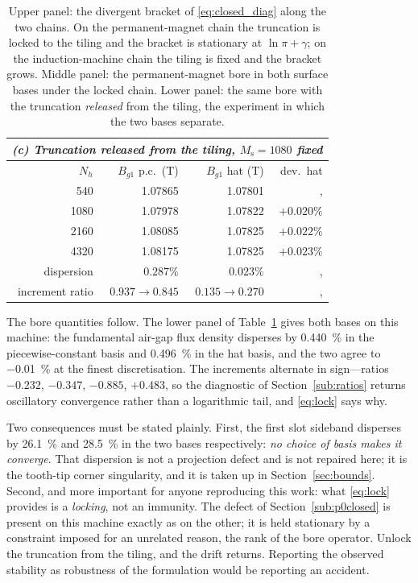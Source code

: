 \documentclass[10pt,a4paper,twocolumn]{article}
\theoremstyle{plain}
\theoremstyle{remark}
\begin{document}
\begin{table}[!ht]
\begin{threeparttable}
\vspace{3mm}

\begin{tabular}{rrrr}
\multicolumn{4}{l}{\emph{(c) Truncation released from the tiling,
$M_{\mathrm{s}}=\num{1080}$ fixed}}\\
\toprule
$N_h$ & $B_{g1}$ p.c.\ (\si{\tesla}) & $B_{g1}$ hat (\si{\tesla}) & dev.\ hat\\
\midrule
\num{540}  & \num{1.07865} & \num{1.07801} &, \\
\num{1080} & \num{1.07978} & \num{1.07822} & $+0.020\%$\\
\num{2160} & \num{1.08085} & \num{1.07825} & $+0.022\%$\\
\num{4320} & \num{1.08175} & \num{1.07825} & $+0.023\%$\\
\midrule
dispersion & $0.287\%$ & $\bm{0.023\%}$ &, \\
increment ratio & $0.937 \to 0.845$ & $\bm{0.135 \to 0.270}$ &, \\
\bottomrule
\end{tabular}
\end{threeparttable}
\caption{Upper panel: the divergent bracket of
\eqref{eq:closed_diag} along the two chains. On the permanent-magnet
chain the truncation is locked to the tiling and the bracket is
stationary at $\ln\pi+\gamma$; on the induction-machine chain the tiling
is fixed and the bracket grows. Middle panel: the permanent-magnet bore
in both surface bases under the locked chain. Lower panel: the same bore
with the truncation \emph{released} from the tiling, the experiment in
which the two bases separate.}
\label{tab:v1basis}
\end{table}

The bore quantities follow. The lower panel of
Table~\ref{tab:v1basis} gives both bases on this machine: the
fundamental air-gap flux density disperses by \SI{0.440}{\percent} in
the piecewise-constant basis and \SI{0.496}{\percent} in the hat basis,
and the two agree to \SI{-0.01}{\percent} at the finest discretisation.
The increments alternate in sign---ratios $-0.232$, $-0.347$, $-0.885$,
$+0.483$, so the diagnostic of Section~\ref{sub:ratios} returns
oscillatory convergence rather than a logarithmic tail, and
\eqref{eq:lock} says why.

Two consequences must be stated plainly. First, the first slot sideband
disperses by \SI{26.1}{\percent} and \SI{28.5}{\percent} in the two
bases respectively: \emph{no choice of basis makes it converge}. That
dispersion is not a projection defect and is not repaired here; it is
the tooth-tip corner singularity, and it is taken up in
Section~\ref{sec:bounds}. Second, and more important for anyone
reproducing this work: what \eqref{eq:lock} provides is a
\emph{locking}, not an immunity. The defect of
Section~\ref{sub:p0closed} is present on this machine exactly as on the
other; it is held stationary by a constraint imposed for an unrelated
reason, the rank of the bore operator. Unlock the truncation from the
tiling, and the drift returns. Reporting the observed stability as
robustness of the formulation would be reporting an accident.
\end{document}
